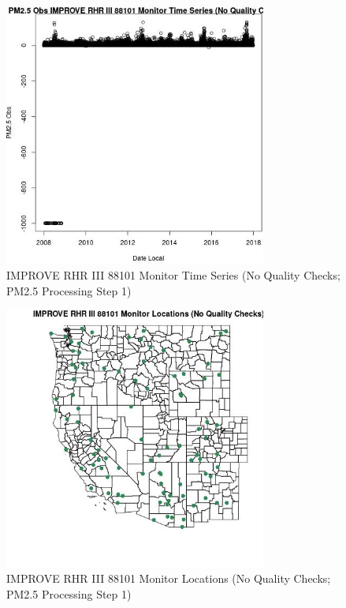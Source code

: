 
\begin{figure} 
\centering  
\includegraphics[width=0.77\textwidth]{Code_Outputs/PM25Source7TSstep1_PM25_ObsvDate_Local.jpg} 
\caption{\label{fig:PM25Source7TSstep1PM25_ObsvDate_Local}IMPROVE RHR III 88101 Monitor Time Series (No Quality Checks; PM2.5 Processing Step 1)} 
\end{figure} 
 

\begin{figure} 
\centering  
\includegraphics[width=0.77\textwidth]{Code_Outputs/PM25Source7TSstep1_MapIMPRHRIII88101Locations.jpg} 
\caption{\label{fig:PM25Source7TSstep1MapIMPRHRIII88101Locations}IMPROVE RHR III 88101 Monitor Locations (No Quality Checks; PM2.5 Processing Step 1)} 
\end{figure} 
 
